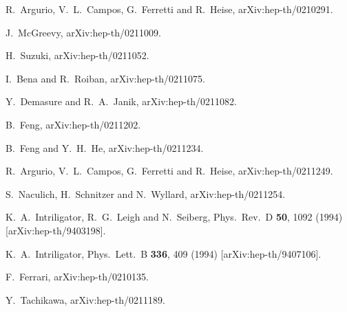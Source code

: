 \documentclass[a4paper,12pt]{article}
\begin{document}
\begin{thebibliography}{99}
R.~Argurio, V.~L.~Campos, G.~Ferretti and R.~Heise,
arXiv:hep-th/0210291.

J.~McGreevy,
arXiv:hep-th/0211009.

H.~Suzuki,
arXiv:hep-th/0211052.

I.~Bena and R.~Roiban,
arXiv:hep-th/0211075.

Y.~Demasure and R.~A.~Janik,
arXiv:hep-th/0211082.

B.~Feng,
arXiv:hep-th/0211202.

B.~Feng and Y.~H.~He,
arXiv:hep-th/0211234.

R.~Argurio, V.~L.~Campos, G.~Ferretti and R.~Heise,
arXiv:hep-th/0211249.

S.~Naculich, H.~Schnitzer and N.~Wyllard,
arXiv:hep-th/0211254.


K.~A.~Intriligator, R.~G.~Leigh and N.~Seiberg,
Phys.\ Rev.\ D {\bf 50}, 1092 (1994)
[arXiv:hep-th/9403198].

K.~A.~Intriligator,
Phys.\ Lett.\ B {\bf 336}, 409 (1994)
[arXiv:hep-th/9407106].

F.~Ferrari,
arXiv:hep-th/0210135.

Y.~Tachikawa,
arXiv:hep-th/0211189.



\end{thebibliography}
\end{document}
